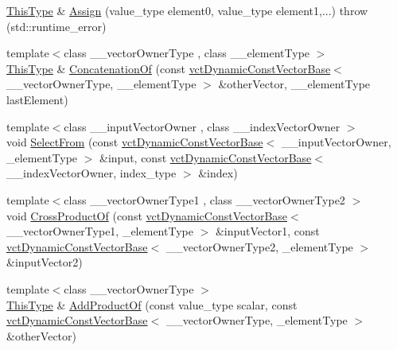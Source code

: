 \begin{DoxyCompactItemize}
\item 
\hyperlink{classvct_dynamic_const_vector_base_a39da273523717f678f54d3321ebca3dd}{This\-Type} \& \hyperlink{classvct_dynamic_vector_base_a769dc8306b512b908e694195a3b99831}{Assign} (value\-\_\-type element0, value\-\_\-type element1,...)  throw (std\-::runtime\-\_\-error)
\item 
{\footnotesize template$<$class \-\_\-\-\_\-vector\-Owner\-Type , class \-\_\-\-\_\-element\-Type $>$ }\\\hyperlink{classvct_dynamic_const_vector_base_a39da273523717f678f54d3321ebca3dd}{This\-Type} \& \hyperlink{classvct_dynamic_vector_base_a821f0b7240811f28a154aab6dd91f5e6}{Concatenation\-Of} (const \hyperlink{classvct_dynamic_const_vector_base}{vct\-Dynamic\-Const\-Vector\-Base}$<$ \-\_\-\-\_\-vector\-Owner\-Type, \-\_\-\-\_\-element\-Type $>$ \&other\-Vector, \-\_\-\-\_\-element\-Type last\-Element)
\item 
{\footnotesize template$<$class \-\_\-\-\_\-input\-Vector\-Owner , class \-\_\-\-\_\-index\-Vector\-Owner $>$ }\\void \hyperlink{classvct_dynamic_vector_base_a5c4b71a4400bd77cfd0978f6ea5306d4}{Select\-From} (const \hyperlink{classvct_dynamic_const_vector_base}{vct\-Dynamic\-Const\-Vector\-Base}$<$ \-\_\-\-\_\-input\-Vector\-Owner, \-\_\-element\-Type $>$ \&input, const \hyperlink{classvct_dynamic_const_vector_base}{vct\-Dynamic\-Const\-Vector\-Base}$<$ \-\_\-\-\_\-index\-Vector\-Owner, index\-\_\-type $>$ \&index)
\item 
{\footnotesize template$<$class \-\_\-\-\_\-vector\-Owner\-Type1 , class \-\_\-\-\_\-vector\-Owner\-Type2 $>$ }\\void \hyperlink{classvct_dynamic_vector_base_a716dd14b3357992e5c4b8c395a93e0b3}{Cross\-Product\-Of} (const \hyperlink{classvct_dynamic_const_vector_base}{vct\-Dynamic\-Const\-Vector\-Base}$<$ \-\_\-\-\_\-vector\-Owner\-Type1, \-\_\-element\-Type $>$ \&input\-Vector1, const \hyperlink{classvct_dynamic_const_vector_base}{vct\-Dynamic\-Const\-Vector\-Base}$<$ \-\_\-\-\_\-vector\-Owner\-Type2, \-\_\-element\-Type $>$ \&input\-Vector2)
\item 
{\footnotesize template$<$class \-\_\-\-\_\-vector\-Owner\-Type $>$ }\\\hyperlink{classvct_dynamic_const_vector_base_a39da273523717f678f54d3321ebca3dd}{This\-Type} \& \hyperlink{classvct_dynamic_vector_base_a26a9316f13b80d311bb2eb356503e5f7}{Add\-Product\-Of} (const value\-\_\-type scalar, const \hyperlink{classvct_dynamic_const_vector_base}{vct\-Dynamic\-Const\-Vector\-Base}$<$ \-\_\-\-\_\-vector\-Owner\-Type, \-\_\-element\-Type $>$ \&other\-Vector)

\end{DoxyCompactItemize}
